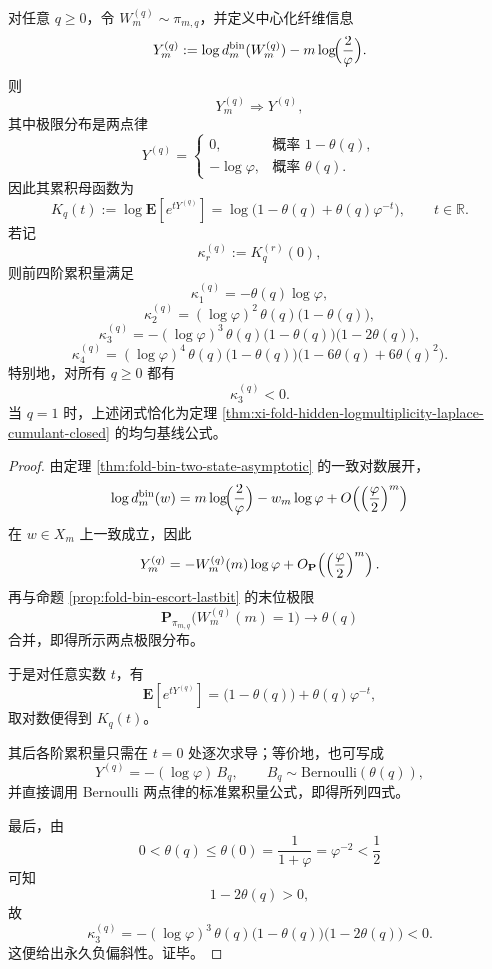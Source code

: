 \begin{theorem}\label{thm:xi-time-part9ob-escort-loginfo-cumulants-negative-skew}
对任意 \(q\ge 0\)，令 \(W_m^{(q)}\sim \pi_{m,q}\)，并定义中心化纤维信息
\[
Y_m^{(q)}
:=
\log d_m^{\mathrm{bin}}(W_m^{(q)})
-m\log\!\Bigl(\frac{2}{\varphi}\Bigr).
\]
则
\[
Y_m^{(q)}\Longrightarrow Y^{(q)},
\]
其中极限分布是两点律
\[
Y^{(q)}=
\begin{cases}
0,& \text{概率 }1-\theta(q),\\
-\log\varphi,& \text{概率 }\theta(q).
\end{cases}
\]
因此其累积母函数为
\[
K_q(t)
:=
\log \mathbf E\!\left[e^{tY^{(q)}}\right]
=
\log\!\bigl(1-\theta(q)+\theta(q)\varphi^{-t}\bigr),
\qquad t\in\mathbb R.
\]
若记
\[
\kappa_r^{(q)}:=K_q^{(r)}(0),
\]
则前四阶累积量满足
\[
\kappa_1^{(q)}=-\theta(q)\log\varphi,
\]
\[
\kappa_2^{(q)}=(\log\varphi)^2\,\theta(q)\bigl(1-\theta(q)\bigr),
\]
\[
\kappa_3^{(q)}=-(\log\varphi)^3\,\theta(q)\bigl(1-\theta(q)\bigr)\bigl(1-2\theta(q)\bigr),
\]
\[
\kappa_4^{(q)}=(\log\varphi)^4\,\theta(q)\bigl(1-\theta(q)\bigr)\bigl(1-6\theta(q)+6\theta(q)^2\bigr).
\]
特别地，对所有 \(q\ge 0\) 都有
\[
\kappa_3^{(q)}<0.
\]
当 \(q=1\) 时，上述闭式恰化为定理 \ref{thm:xi-fold-hidden-logmultiplicity-laplace-cumulant-closed} 的均匀基线公式。
\end{theorem}
\begin{proof}
由定理 \ref{thm:fold-bin-two-state-asymptotic} 的一致对数展开，
\[
\log d_m^{\mathrm{bin}}(w)
=
m\log\!\Bigl(\frac{2}{\varphi}\Bigr)-w_m\log\varphi
+O\!\left(\Bigl(\frac{\varphi}{2}\Bigr)^m\right)
\]
在 \(w\in X_m\) 上一致成立，因此
\[
Y_m^{(q)}
=
-W_m^{(q)}(m)\log\varphi
+O_{\mathbf P}\!\left(\Bigl(\frac{\varphi}{2}\Bigr)^m\right).
\]
再与命题 \ref{prop:fold-bin-escort-lastbit} 的末位极限
\[
\mathbf P_{\pi_{m,q}}\bigl(W_m^{(q)}(m)=1\bigr)\to \theta(q)
\]
合并，即得所示两点极限分布。

于是对任意实数 \(t\)，有
\[
\mathbf E\!\left[e^{tY^{(q)}}\right]
=
\bigl(1-\theta(q)\bigr)+\theta(q)\varphi^{-t},
\]
取对数便得到 \(K_q(t)\)。

其后各阶累积量只需在 \(t=0\) 处逐次求导；等价地，也可写成
\[
Y^{(q)}=-(\log\varphi)\,B_q,
\qquad
B_q\sim \mathrm{Bernoulli}(\theta(q)),
\]
并直接调用 Bernoulli 两点律的标准累积量公式，即得所列四式。

最后，由
\[
0<\theta(q)\le \theta(0)=\frac{1}{1+\varphi}=\varphi^{-2}<\frac12
\]
可知
\[
1-2\theta(q)>0,
\]
故
\[
\kappa_3^{(q)}
=
-(\log\varphi)^3\,\theta(q)\bigl(1-\theta(q)\bigr)\bigl(1-2\theta(q)\bigr)<0.
\]
这便给出永久负偏斜性。证毕。
\end{proof}

